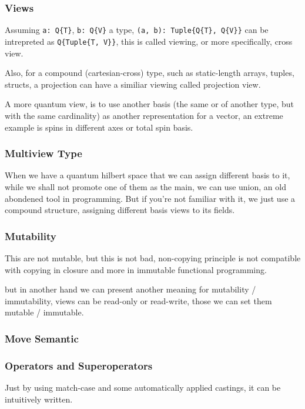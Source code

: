 \documentclass[a4paper,11pt]{article}
\def\co{\lstinline}
\begin{document}
\subsubsection{Views}
Assuming \co|a: Q{T}|, \co|b: Q{V}| a type, \co|(a, b): Tuple{Q{T}, Q{V}}| can be intrepreted as \co|Q{Tuple{T, V}}|, this is called viewing, or more specifically, cross view.

Also, for a compound (cartesian-cross) type, such as static-length arrays, tuples, structs, a projection can have a similiar viewing called projection view.

A more quantum view, is to use another basis (the same or of another type, but with the same cardinality) as another representation for a vector, an extreme example is spins in different axes or total spin basis.

\subsubsection{Multiview Type}

When we have a quantum hilbert space that we can assign different basis to it, while we shall not promote one of them as the main, we can use union, an old abondened tool in programming. But if you're not familiar with it, we just use a compound structure, assigning different basis views to its fields.

\subsubsection{Mutability}

This are not mutable, but this is not bad, non-copying principle is not compatible with copying in closure and more in immutable functional programming.

but in another hand we can present another meaning for mutability / immutability,
views can be read-only or read-write, those we can set them mutable / immutable.

\subsubsection{Move Semantic}

\subsubsection{Operators and Superoperators}
Just by using match-case and some automatically applied castings, it can be intuitively written.
\end{document}

